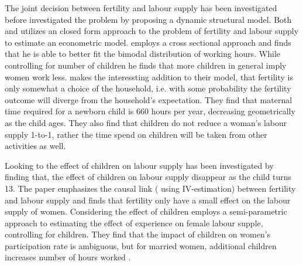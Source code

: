 The joint decision between fertility and labour supply has been investigated before \textcite{francesconi_joint_2002} investigated the problem by proposing a dynamic structural model. Both \textcite{moffitt_estimation_1984} and \textcite{hotz_empirical_1988} utilizes an closed form approach to the problem of fertility and labour supply to estimate an econometric model. \textcite{moffitt_estimation_1984} employs a cross sectional approach and finds that he is able to better fit the bimodal distribution of working hours. While controlling for number of children he finds that more children in general imply women work less. \textcite{hotz_empirical_1988} makes the interessting addition to their model, that fertility is only somewhat a choice of the household, i.e. with some probability the fertility outcome will diverge from the household's expectation. They find that maternal time required for a newborn child is 660 hours per year, decreasing geometrically as the child ages. They also find that children do not reduce a woman's labour supply 1-to-1, rather the time spend on children will be taken from other activities as well.

Looking to the effect of children on labour supply has been investigated by \parencite{angrist_children_1996} finding that, the effect of children on labour supply disappear as the child turns 13. The paper emphasizes the causal link ( using IV-estimation) between fertility and labour supply and finds that fertility only have a small effect on the labour supply of women. Considering the effect of children  \parencite{altug_effect_1998} employs a semi-parametric approach to estimating the effect of experience on female labour supple, controlling for children. They find that the impact of children on women's participation rate is ambiguous, but for married women, additional children increases number of hours worked \parencite{altug_effect_1998}.